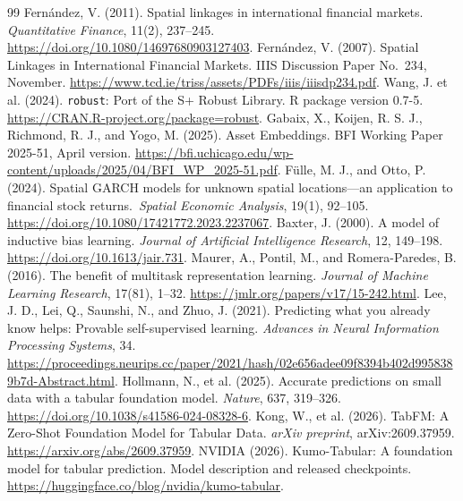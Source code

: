 \documentclass[11pt]{article}
\begin{document}
\begin{thebibliography}{99}
  Fern\'andez, V. (2011).
  Spatial linkages in international financial markets.
  \emph{Quantitative Finance}, 11(2), 237--245.
  \url{https://doi.org/10.1080/14697680903127403}.
  Fern\'andez, V. (2007).
  Spatial Linkages in International Financial Markets.
  IIIS Discussion Paper No.~234, November.
  \url{https://www.tcd.ie/triss/assets/PDFs/iiis/iiisdp234.pdf}.
  Wang, J. et al. (2024).
  \texttt{robust}: Port of the S+ Robust Library. R package version
  0.7-5. %
  \url{https://CRAN.R-project.org/package=robust}.
  Gabaix, X., Koijen, R. S. J., Richmond, R. J., and Yogo, M. (2025).
  Asset Embeddings. BFI Working Paper 2025-51, April version. %
  \url{https://bfi.uchicago.edu/wp-content/uploads/2025/04/BFI_WP_2025-51.pdf}. %
  F\"ulle, M. J., and Otto, P. (2024).
  Spatial GARCH models for unknown spatial locations---an application to
  financial stock returns.\ \emph{Spatial Economic Analysis}, 19(1), 92--105.
  \url{https://doi.org/10.1080/17421772.2023.2237067}.
  Baxter, J. (2000). A model of inductive bias learning.
  \emph{Journal of Artificial Intelligence Research}, 12, 149--198.
  \url{https://doi.org/10.1613/jair.731}.
  Maurer, A., Pontil, M., and Romera-Paredes, B. (2016).
  The benefit of multitask representation learning.
  \emph{Journal of Machine Learning Research}, 17(81), 1--32.
  \url{https://jmlr.org/papers/v17/15-242.html}. %
  Lee, J. D., Lei, Q., Saunshi, N., and Zhuo, J. (2021).
  Predicting what you already know helps: Provable self-supervised learning.
  \emph{Advances in Neural Information Processing Systems}, 34.
  \url{https://proceedings.neurips.cc/paper/2021/hash/02e656adee09f8394b402d9958389b7d-Abstract.html}.
  Hollmann, N., et al. (2025).
  Accurate predictions on small data with a tabular foundation model.
  \emph{Nature}, 637, 319--326.
  \url{https://doi.org/10.1038/s41586-024-08328-6}. %
  Kong, W., et al. (2026).
  TabFM\@: A Zero-Shot Foundation Model for Tabular Data.
  \emph{arXiv preprint}, arXiv:2609.37959.
  \url{https://arxiv.org/abs/2609.37959}.
  NVIDIA (2026). Kumo-Tabular: A foundation model for tabular prediction.
  Model description and released checkpoints.
  \url{https://huggingface.co/blog/nvidia/kumo-tabular}.

\end{thebibliography}
\end{document}
